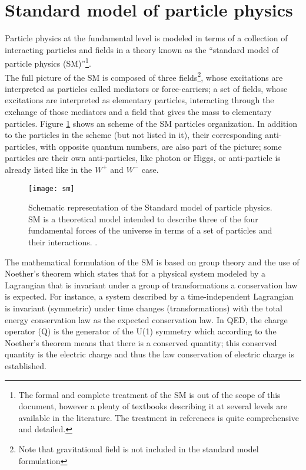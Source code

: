 \section{Standard model of particle physics}
\label{secc:SM}

\noindent Particle physics at the fundamental level is modeled in terms of a collection of interacting particles and fields in a theory known as the ``standard model of particle physics (SM)''\footnote{The formal and complete treatment of the SM is out of the scope of this document, however a plenty of textbooks describing it at several levels are available in the literature. The treatment in references \cite{mandl.halsen} is quite comprehensive and detailed.}.\\

\noindent The full picture of the SM is composed of three fields\footnote{Note that gravitational field is not included in the standard model formulation}, whose excitations are interpreted as particles called mediators or force-carriers; a set of fields, whose excitations are interpreted as elementary particles, interacting through the exchange of those mediators and a field that gives the mass to elementary particles. Figure \ref{sm} shows an scheme of the SM particles organization. In addition to the particles in the scheme (but not listed in it), their corresponding anti-particles, with opposite quantum numbers, are also part of the picture; some particles are their own anti-particles, like photon or Higgs, or anti-particle is already listed like in the $W^+$  and $W^-$ case.\\

\begin{figure}[h!]
  \centering
  \texttt{[image: sm]}
  \caption[Standard model of particle physics.]{Schematic representation of the Standard model of particle physics. SM is a theoretical model intended to describe three of the four fundamental forces of the universe in terms of a set of particles and their interactions. \cite{smpicture}.}
  \label{sm}
\end{figure}

\noindent The mathematical formulation of the SM is based on group theory and the use of Noether's theorem\cite{noether} which states that for a physical system modeled by a Lagrangian that is invariant under a group of transformations a conservation law is expected. For instance, a system described by a time-independent Lagrangian is invariant (symmetric) under time changes (transformations) with the total energy conservation law as the expected conservation law. In QED, the charge operator (Q) is the generator of the U(1) symmetry which according to the Noether's theorem means that there is a conserved quantity; this conserved quantity is the electric charge and thus the law conservation of electric charge is established.\\

